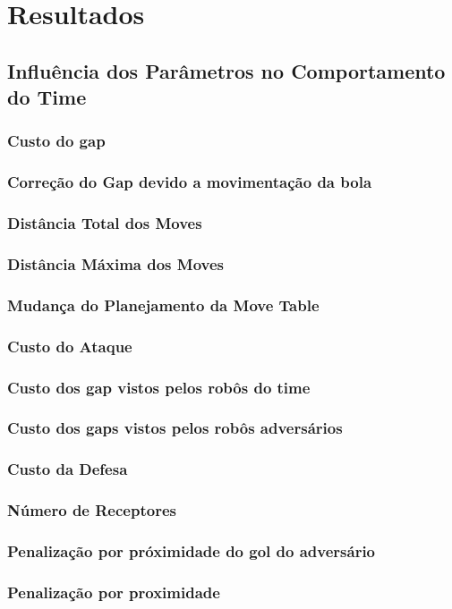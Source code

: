 \chapter{Resultados}\label{cap:resultados}



\section{Influência dos Parâmetros no Comportamento do Time}
\subsection{Custo do gap}
\subsection{Correção do Gap devido a movimentação da bola}
\subsection{Distância Total dos Moves}
\subsection{Distância Máxima dos Moves}
\subsection{Mudança do Planejamento da Move Table}
\subsection{Custo do Ataque}
\subsection{Custo dos gap vistos pelos robôs do time}
\subsection{Custo dos gaps vistos pelos robôs adversários}
\subsection{Custo da Defesa}
\subsection{Número de Receptores}
\subsection{Penalização por próximidade do gol do adversário}
\subsection{Penalização por proximidade}

